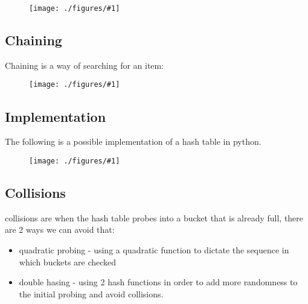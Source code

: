 \documentclass[12pt]{book}
\newcommand{\incimg}[2]{%
       \begin{figure}[h]
               \centering
               \texttt{[image: ./figures/\#1]}
       \end{figure}
}
\begin{document}
\incimg{openVclose}{0.2}

\pagebreak
\subsection*{Chaining} Chaining is a way of searching for an item:

\incimg{chain}{0.2}

\pagebreak
\subsection*{Implementation} The following is a possible implementation of a hash table in python.

\incimg{openHash}{0.2}

\pagebreak
\subsection*{Collisions}
collisions are when the hash table probes into a bucket that is already full, there are 2 ways we can avoid that:
\begin{itemize}
        \item quadratic probing - using a quadratic function to dictate the sequence in which buckets are checked
        \item double hasing - using 2 hash functions in order to add more randomness to the initial probing and avoid collisions.
\end{itemize}
\end{document}
